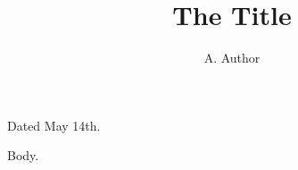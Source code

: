 \documentclass{iopart}
\begin{document}
\title{The Title}
\author{A. Author}
Dated May 14th.
\maketitle
Body.
\end{document}
